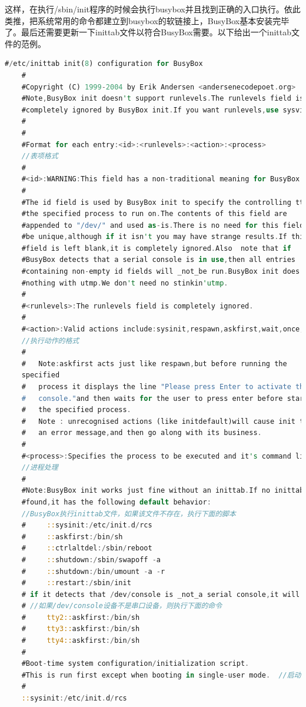 这样，在执行/sbin/init程序的时候会执行busybox并且找到正确的入口执行。依此类推，把系统常用的命令都建立到busybox的软链接上，BusyBox基本安装完毕了。最后还需要更新一下inittab文件以符合BusyBox需要。以下给出一个inittab文件的范例。
\begin{lstlisting}[language=Rust]
	#/etc/inittab init(8) configuration for BusyBox
	#
	#Copyright (C) 1999-2004 by Erik Andersen <andersenecodepoet.org>
	#Note,BusyBox init doesn't support runlevels.The runlevels field is
	#completely ignored by BusyBox init.If you want runlevels,use sysvinit.
	#
	#
	#Format for each entry:<id>:<runlevels>:<action>:<process>
	//表项格式
	#
	#<id>:WARNING:This field has a non-traditional meaning for BusyBox init!
	#
	#The id field is used by BusyBox init to specify the controlling tty for
	#the specified process to run on.The contents of this field are
	#appended to "/dev/" and used as-is.There is no need for this field to
	#be unique,although if it isn't you may have strange results.If this
	#field is left blank,it is completely ignored.Also 	note that if
	#BusyBox detects that a serial console is in use,then all entries
	#containing non-empty id fields will _not_be run.BusyBox init does
	#nothing with utmp.We don't need no stinkin'utmp.
	#
	#<runlevels>:The runlevels field is completely ignored.
	#
	#<action>:Valid actions include:sysinit,respawn,askfirst,wait,once,#restart,ctrlaltdel,and shutdown.
	//执行动作的格式
	#
	#   Note:askfirst acts just like respawn,but before running the
	specified
	#   process it displays the line "Please press Enter to activate this
	#   console."and then waits for the user to press enter before starting
	#   the specified process.
	#   Note : unrecognised actions (like initdefault)will cause init to emit
	#   an error message,and then go along with its business.
	#
	#<process>:Specifies the process to be executed and it's command line.
	//进程处理
	#
	#Note:BusyBox init works just fine without an inittab.If no inittab is
	#found,it has the following default behavior: 
	//BusyBox执行inittab文件，如果该文件不存在，执行下面的脚本
	#     ::sysinit:/etc/init.d/rcs
	#     ::askfirst:/bin/sh
	#     ::ctrlaltdel:/sbin/reboot
	#     ::shutdown:/sbin/swapoff -a
	#     ::shutdown:/bin/umount -a -r
	#     ::restart:/sbin/init
	# if it detects that /dev/console is _not_a serial console,it will also run:
	# //如果/dev/console设备不是串口设备，则执行下面的命令
	#     tty2::askfirst:/bin/sh
	#     tty3::askfirst:/bin/sh
	#     tty4::askfirst:/bin/sh
	#
	#Boot-time system configuration/initialization script.
	#This is run first except when booting in single-user mode.  //启动时运行的脚本
	#
	::sysinit:/etc/init.d/rcs


\end{lstlisting}
